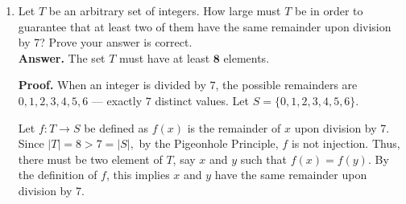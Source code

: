 \documentclass[11pt]{article}
\begin{document}
\begin{enumerate}
Prove that if $f:A\to B$ and $g:B\to C$ are bijections, then $g\circ f:A\to C$ is a bijection.

\medskip
\textbf{Proof.}
We must show that $g\circ f$ is both injective and surjective.

\medskip
\textit{Injective.}\\
Suppose $a_1,a_2\in A$ and $(g\circ f)(a_1)=(g\circ f)(a_2)$ (or equivalently $g(f(a_1))=g(f(a_2))$).\\

Since $g$ is injective, it follows that $f(a_1)=f(a_2)$. Since $f$ is injective, it follows that $a_1=a_2$.\\

Hence $g\circ f$ is injective.

\medskip
\textit{Surjective.}

Let $c\in C$ be arbitrary.\\

Since $g$ is surjective, there exists $b\in B$ such that $g(b)=c$. Since $f$ is surjective, there exists $a\in A$ such that $f(a)=b$.\\

Now, observe that  $(g\circ f)(a)=g(f(a))=g(b)=c$.\\

Since $c$ was arbitrary, $g\circ f$ is surjective.\\


Since $g\circ f$ is both injective and surjective, it is a bijection. $\blacksquare$


\item Let $T$ be an arbitrary set of integers. How large must $T$ be in order to guarantee that at least two of them have the same remainder upon division by 7? Prove your answer is correct.\\

\textbf{Answer.} The set $T$ must have at least $\mathbf{8}$ elements.

\medskip
\textbf{Proof.}
When an integer is divided by $7$, the possible remainders are $0,1,2,3,4,5,6$ --- exactly $7$ distinct values. Let $S=\{0,1,2,3,4,5,6\}.$

Let $f: T \to S$ be defined as $f(x)$ is the remainder of $x$ upon division by 7.\\

Since $|T|=8>7=|S|,$ by the Pigeonhole Principle, $f$ is not injection. Thus, there must be two element of $T$, say $x$ and $y$ such that $f(x)=f(y).$ By the definition of $f$, this implies $x$ and $y$ have the same remainder upon division by 7.\\



\end{enumerate}
\end{document}
